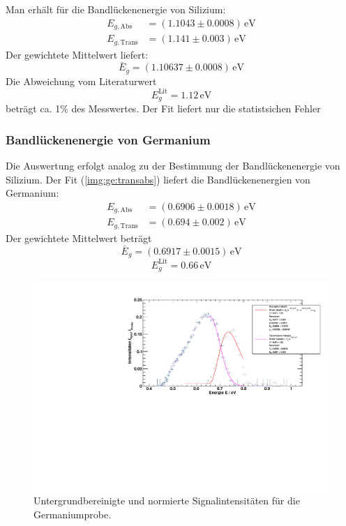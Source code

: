 Man erhält für die Bandlückenenergie von Silizium:
\begin{equation}
\begin{split}
  E_{g, \text{Abs}} &= (1.1043 \pm 0.0008)\,\text{eV} \\
  E_{g, \text{Trans}} &= (1.141 \pm 0.003)\,\text{eV}
\end{split}
\end{equation}
Der gewichtete Mittelwert liefert:
\begin{equation}
  \bar{E}_g = (1.10637 \pm 0.0008)\,\text{eV}
\end{equation}
Die Abweichung vom Literaturwert
\begin{equation}
  E_g^{\text{Lit}} = 1.12\,\text{eV}
\end{equation}
beträgt ca. 1\% des Messwertes. Der Fit liefert nur die statistsichen Fehler 


\subsubsection{Bandlückenenergie von Germanium}
Die Auswertung erfolgt analog zu der Bestimmung der Bandlückenenergie von Silizium. Der Fit (\autoref{img:ge:transabs})
liefert die Bandlückenenergien von Germanium:
\begin{equation}
\begin{split}
  E_{g, \text{Abs}} &= (0.6906 \pm 0.0018)\,\text{eV} \\
  E_{g, \text{Trans}} &= (0.694 \pm 0.002)\,\text{eV}
\end{split}
\end{equation}
Der gewichtete Mittelwert beträgt
\begin{equation}
  \bar{E}_g = (0.6917 \pm 0.0015)\,\text{eV}
\end{equation}
\begin{equation}
  E_g^{\text{Lit}} = 0.66\,\text{eV}
\end{equation}

\begin{figure}[H]
\begin{center}
  \includegraphics[width=\textwidth]{../img/part1/Ge_fit_AbsTrans.pdf}
  \caption{Untergrundbereinigte und normierte Signalintensitäten für die Germaniumprobe.}
  \label{img:ge:transabs}
\end{center}
\end{figure}
